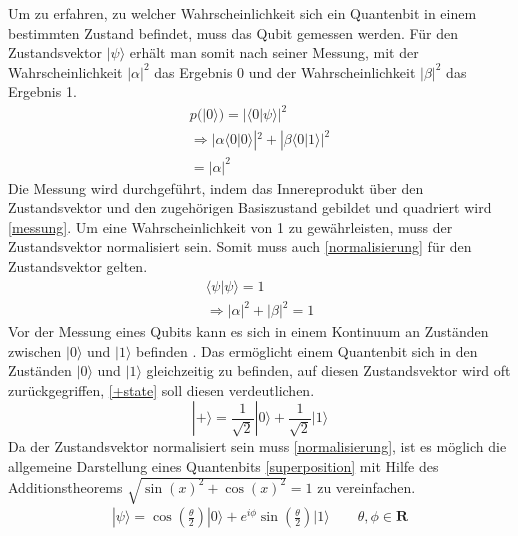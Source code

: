 Um zu erfahren, zu welcher Wahrscheinlichkeit sich ein Quantenbit in einem bestimmten Zustand befindet, muss das Qubit gemessen werden. F\"ur den Zustandsvektor $|\psi\rangle$ erh\"alt man somit nach seiner Messung, mit der Wahrscheinlichkeit $|\alpha|^2$ das Ergebnis 0 und der Wahrscheinlichkeit $|\beta|^2$ das Ergebnis 1.
\begin{equation}\label{messung}
        \begin{gathered}
                p(|0\rangle) = |\langle 0|\psi \rangle|^2 \\
                \Rightarrow | \alpha \langle 0|0 \rangle|^2 + |\beta \langle 0|1 \rangle |^2 \\
                = | \alpha |^2
        \end{gathered}       
\end{equation}
Die Messung wird durchgef\"uhrt, indem das Innereprodukt \"uber den Zustandsvektor und den zugeh\"origen Basiszustand gebildet und quadriert wird \ref{messung}. Um eine Wahrscheinlichkeit von 1 zu gew\"ahrleisten, muss der Zustandsvektor normalisiert sein. Somit muss auch \ref{normalisierung} f\"ur den Zustandsvektor gelten.
\begin{equation}\label{normalisierung}
\begin{gathered}
         \langle \psi | \psi \rangle = 1 \\
         \Rightarrow |\alpha|^2 +|\beta|^2 = 1
\end{gathered}
\end{equation}
Vor der Messung eines Qubits kann es sich in einem Kontinuum an Zust\"anden zwischen $|0\rangle$ und $|1\rangle$ befinden \cite{nielsen_chuang_2010}. Das erm\"oglicht einem Quantenbit sich in den Zust\"anden $|0\rangle$ und $|1\rangle$ gleichzeitig zu befinden, auf diesen Zustandsvektor wird oft zur\"uckgegriffen, \ref{+state} soll diesen verdeutlichen.
\begin{equation}\label{+state}
|+\rangle = \frac{1}{\sqrt{2}}|0\rangle+\frac{1}{\sqrt{2}}|1\rangle
\end{equation}
Da der Zustandsvektor normalisiert sein muss \ref{normalisierung}, ist es m\"oglich die allgemeine Darstellung eines Quantenbits \ref{superposition} mit Hilfe des Additionstheorems $\sqrt{\sin(x)^2+\cos(x)^2} = 1$ zu vereinfachen.
\begin{equation}\label{bloch-kugel}
\begin{gathered}
|\psi\rangle = \cos\left(\frac{\theta}{2}\right)|0\rangle+e^{i\phi}\sin\left(\frac{\theta}{2}\right)|1\rangle \qquad \theta, \phi \in \mathbf{R}
\end{gathered}
\end{equation}
